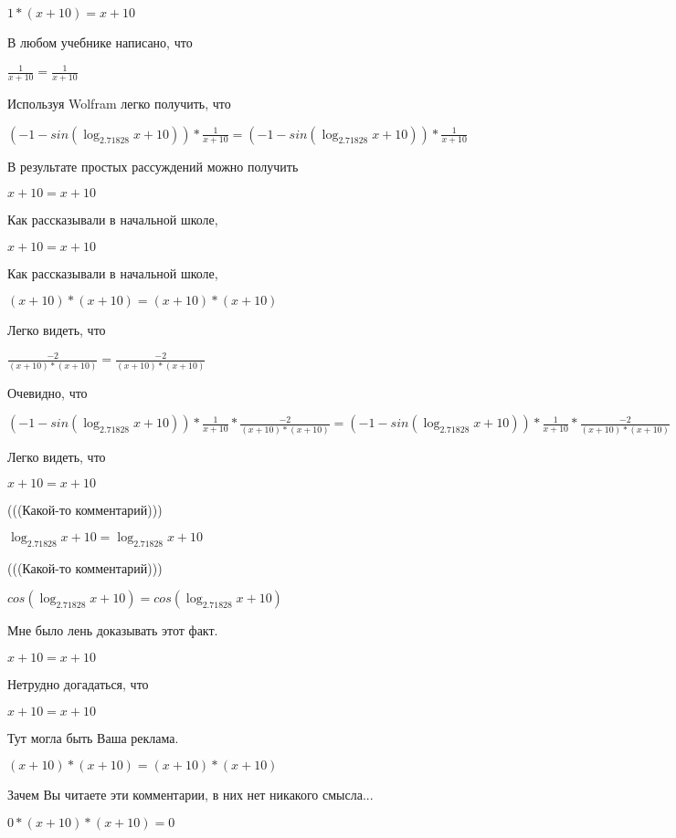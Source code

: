 \documentclass[12pt,a4paper,fleqn]{article}
\theoremstyle{definition}
\begin{document}
$ 1  * ( x  +  10 ) =  x  +  10 $

В любом учебнике написано, что

$\frac{ 1 }{ x  +  10 }
 = \frac{ 1 }{ x  +  10 }
$

Используя Wolfram легко получить, что

$( -1  - sin(\log_{ 2.71828 }{ x  +  10 })) * \frac{ 1 }{ x  +  10 }
 = ( -1  - sin(\log_{ 2.71828 }{ x  +  10 })) * \frac{ 1 }{ x  +  10 }
$

В результате простых рассуждений можно получить

$ x  +  10  =  x  +  10 $

Как рассказывали в начальной школе,

$ x  +  10  =  x  +  10 $

Как рассказывали в начальной школе,

$( x  +  10 ) * ( x  +  10 ) = ( x  +  10 ) * ( x  +  10 )$

Легко видеть, что

$\frac{ -2 }{( x  +  10 ) * ( x  +  10 )}
 = \frac{ -2 }{( x  +  10 ) * ( x  +  10 )}
$

Очевидно, что

$( -1  - sin(\log_{ 2.71828 }{ x  +  10 })) * \frac{ 1 }{ x  +  10 }
 * \frac{ -2 }{( x  +  10 ) * ( x  +  10 )}
 = ( -1  - sin(\log_{ 2.71828 }{ x  +  10 })) * \frac{ 1 }{ x  +  10 }
 * \frac{ -2 }{( x  +  10 ) * ( x  +  10 )}
$

Легко видеть, что

$ x  +  10  =  x  +  10 $

(((Какой-то комментарий)))

$\log_{ 2.71828 }{ x  +  10 } = \log_{ 2.71828 }{ x  +  10 }$

(((Какой-то комментарий)))

$cos(\log_{ 2.71828 }{ x  +  10 }) = cos(\log_{ 2.71828 }{ x  +  10 })$

Мне было лень доказывать этот факт.

$ x  +  10  =  x  +  10 $

Нетрудно догадаться, что

$ x  +  10  =  x  +  10 $

Тут могла быть Ваша реклама.

$( x  +  10 ) * ( x  +  10 ) = ( x  +  10 ) * ( x  +  10 )$

Зачем Вы читаете эти комментарии, в них нет никакого смысла...

$ 0  * ( x  +  10 ) * ( x  +  10 ) =  0 $
\end{document}
